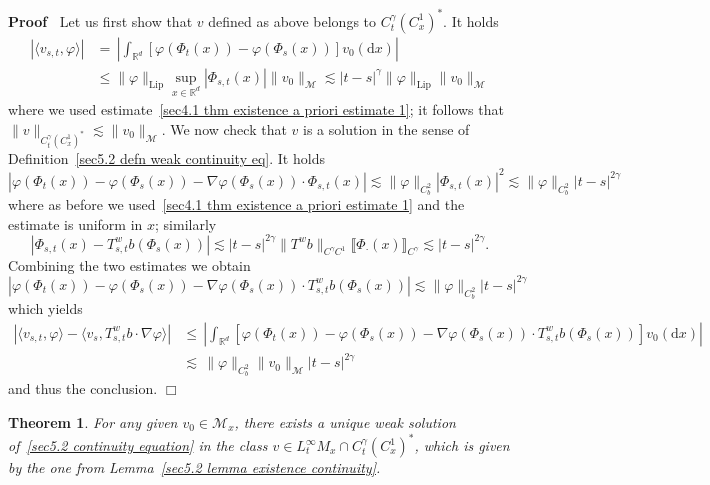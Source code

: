 \documentclass[10pt]{article}
\newcommand{\mathd}{\mathrm{d}}
\newcommand{\tmop}[1]{\ensuremath{\operatorname{#1}}}
\newenvironment{proof}{\noindent\textbf{Proof\ }}{\hspace*{\fill}$\Box$\medskip}
\newtheorem{theorem}{Theorem}
\begin{document}
\begin{proof}
  Let us first show that $v$ defined as above belongs to $C^{\gamma}_t
  (C^1_x)^{\ast}$. It holds
%  
  \begin{align*}
    | \langle v_{s, t}, \varphi \rangle | & = \, \left| \int_{\mathbb{R}^d}
    [\varphi (\Phi_t (x)) - \varphi (\Phi_s (x))] v_0 (\mathd x) \right|\\
    & \leqslant \| \varphi \|_{\tmop{Lip}} \sup_{x \in \mathbb{R}^d} |
    \Phi_{s, t} (x) |  \| v_0 \|_{\mathcal{M}} \lesssim | t - s |^{\gamma} \|
    \varphi \|_{\tmop{Lip}} \| v_0 \|_{\mathcal{M}}
  \end{align*}
%  
  where we used estimate~{\eqref{sec4.1 thm existence a priori estimate 1}};
  it follows that $\| v \|_{C^{\gamma}_t (C^1_x)^{\ast}} \lesssim \| v_0
  \|_{\mathcal{M}}$. We now check that $v$ is a solution in the sense of
  Definition~\ref{sec5.2 defn weak continuity eq}. It holds
  \[ | \varphi (\Phi_t (x)) - \varphi (\Phi_s (x)) - \nabla \varphi (\Phi_s
     (x)) \cdot \Phi_{s, t} (x) | \lesssim \| \varphi \|_{C^2_b}  | \Phi_{s,
     t} (x) |^2 \lesssim \| \varphi \|_{C^2_b}  | t - s |^{2 \gamma} \]
  where as before we used~{\eqref{sec4.1 thm existence a priori estimate 1}}
  and the estimate is uniform in $x$; similarly
  \[ | \Phi_{s, t} (x) - T^w_{s, t} b (\Phi_s (x)) | \lesssim | t - s |^{2
     \gamma} \| T^w b \|_{C^{\gamma} C^1} \llbracket \Phi_{\cdot} (x)
     \rrbracket_{C^{\gamma}} \lesssim | t - s |^{2 \gamma} . \]
  Combining the two estimates we obtain
  \[ | \varphi (\Phi_t (x)) - \varphi (\Phi_s (x)) - \nabla \varphi (\Phi_s
     (x)) \cdot T^w_{s, t} b (\Phi_s (x)) | \lesssim \| \varphi \|_{C^2_b} | t
     - s |^{2 \gamma} \]
  which yields
%  
  \begin{align*}
    | \langle v_{s, t}, \varphi \rangle - \langle v_s, T^w_{s, t} b \cdot
    \nabla \varphi \rangle | & \leqslant \, \left| \int_{\mathbb{R}^d}
    [\varphi (\Phi_t (x)) - \varphi (\Phi_s (x)) - \nabla \varphi (\Phi_s (x))
    \cdot T^w_{s, t} b (\Phi_s (x))] v_0 (\mathd x) \right|\\
    & \lesssim \, \| \varphi \|_{C^2_b}  \| v_0 \|_{\mathcal{M}}  | t - s
    |^{2 \gamma}
  \end{align*}
%  
  and thus the conclusion.
\end{proof}

\begin{theorem}
  \label{sec5.2 thm uniqueness continuity}For any given $v_0 \in
  \mathcal{M}_x$, there exists a unique weak solution of~{\eqref{sec5.2
  continuity equation}} in the class $v \in L^{\infty}_t M_x \cap C^{\gamma}_t
  (C^1_x)^{\ast}$, which is given by the one from Lemma~\ref{sec5.2 lemma
  existence continuity}.
\end{theorem}
\end{document}
